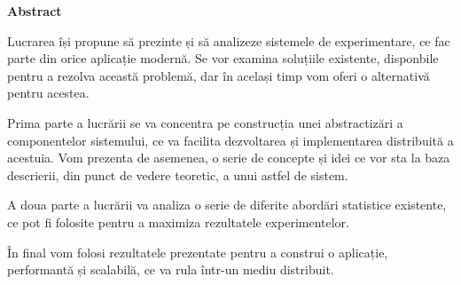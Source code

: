 \thispagestyle{plain}

\vspace*{\fill}

\begin{center}
	\Large \textbf{Abstract}	
\end{center}

Lucrarea își propune să prezinte și să analizeze sistemele de experimentare, ce fac parte din orice aplicație modernă. Se vor examina soluțiile existente, disponbile pentru a rezolva această problemă, dar în același timp vom oferi o alternativă pentru acestea.

Prima parte a lucrării se va concentra pe construcția unei abstractizări a componentelor sistemului, ce va facilita dezvoltarea și implementarea distribuită a acestuia. Vom prezenta  de asemenea, o serie de concepte și idei ce vor sta la baza descrierii, din punct de vedere teoretic, a unui astfel de sistem.

A doua parte a lucrării va analiza o serie de diferite abordări statistice existente, ce pot fi folosite pentru a maximiza rezultatele experimentelor. 

În final vom folosi rezultatele prezentate pentru a construi o aplicație, performantă și scalabilă, ce va rula într-un mediu distribuit.

\vspace*{\fill}